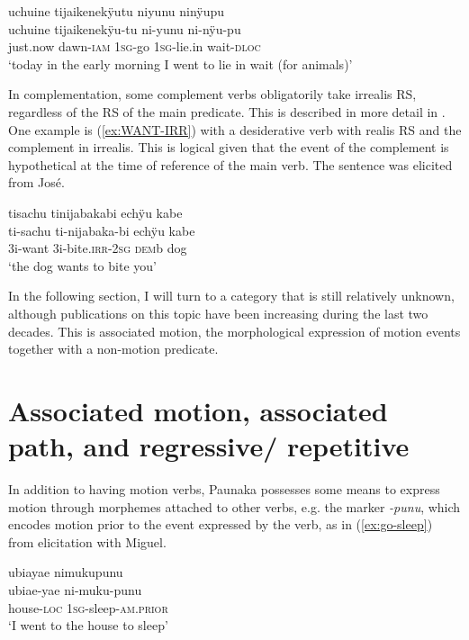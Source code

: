 \ea\label{ex:PURP-pu}
\begingl 
\glpreamble uchuine tijaikenekÿutu niyunu ninÿupu\\
\gla uchuine tijaikenekÿu-tu ni-yunu ni-nÿu-pu\\ 
\glb just.now dawn-\textsc{iam} 1\textsc{sg}-go 1\textsc{sg}-lie.in wait-\textsc{dloc}\\ 
\glft ‘today in the early morning I went to lie in wait (for animals)’
 \trailingcitation{[nxx-a630101g-1.66]}
\xe
{}

In complementation, some complement verbs obligatorily take irrealis RS, regardless of the RS of the main predicate. This is described in more detail in . One example is (\ref{ex:WANT-IRR}) with a desiderative verb with realis RS and the complement in irrealis. This is logical given that the event of the complement is hypothetical at the time of reference of the main verb. The sentence was elicited from José.

\ea\label{ex:WANT-IRR}
\begingl 
\glpreamble tisachu tinijabakabi echÿu kabe\\
\gla ti-sachu ti-nijabaka-bi echÿu kabe\\ 
\glb 3i-want 3i-bite.\textsc{irr}-2\textsc{sg} \textsc{dem}b dog\\ 
\glft ‘the dog wants to bite you’
 \trailingcitation{[oxx-e120414ls-1a.134]}
\xe


In the following section, I will turn to a category that is still relatively unknown, although publications on this topic have been increasing during the last two decades. This is associated motion, the morphological expression of motion events together with a non-motion predicate.


\section{Associated motion, associated path, and regressive/ repetitive}\label{sec:AssociatedMotion}

In addition to having motion verbs, Paunaka possesses some means to express motion through morphemes attached to other verbs, e.g. the marker \textit{-punu}, which encodes motion prior to the event expressed by the verb, as in (\ref{ex:go-sleep}) from elicitation with Miguel.

\ea\label{ex:go-sleep}
\begingl 
\glpreamble ubiayae nimukupunu\\
\gla ubiae-yae ni-muku-punu\\ 
\glb house-\textsc{loc} 1\textsc{sg}-sleep-\textsc{am.prior}\\ 
\glft ‘I went to the house to sleep’
\trailingcitation{[jmx-e090727s.348]}
\xe

